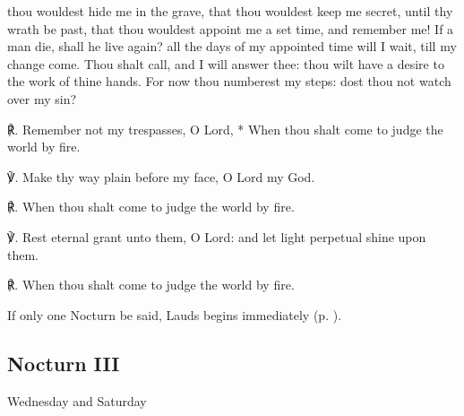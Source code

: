  thou wouldest hide me in the grave, that thou wouldest keep me secret, until thy wrath be past, that thou wouldest appoint me a set time, and remember me! If a man die, shall he live again? all the days of my appointed time will I wait, till my change come. Thou shalt call, and I will answer thee: thou wilt have a desire to the work of thine hands. For now thou numberest my steps: dost thou not watch over my sin?\par
℟. Remember not {\dag} my trespasses, O Lord, * When thou shalt come to judge the world by fire.\par
℣. Make thy way plain before my face, O Lord my God.\par
℟. When thou shalt come to judge the world by fire.\par
℣. Rest eternal grant unto them, O Lord: and let light perpetual shine upon them.\par
℟. When thou shalt come to judge the world by fire.
\begin{rubric}
    {If only one Nocturn be said, Lauds begins immediately (p. \pageref{laudsdead}).}
\end{rubric}
\subsection{Nocturn III}
\begin{inhead}
Wednesday and Saturday
\end{inhead}
